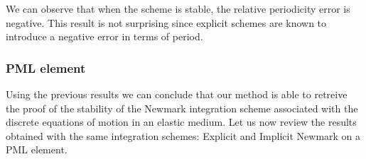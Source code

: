 \begin{itemize}
\begin{figure}[H]
\begin{minipage}{.5\textwidth}
  \label{fig:num_damp_med_exp}
\end{minipage}
\end{figure} 
We can observe that when the scheme is stable, the relative periodicity error is negative. This result is not surprising since explicit schemes are known to introduce a negative error in terms of period.     
\end{itemize}

\subsubsection{PML element}
Using the previous results we can conclude that our method is able to retreive the proof of the stability of the Newmark integration scheme associated with the discrete equations of motion in an elastic medium. Let us now review the results obtained with the same integration schemes: Explicit and Implicit Newmark on a PML element.
